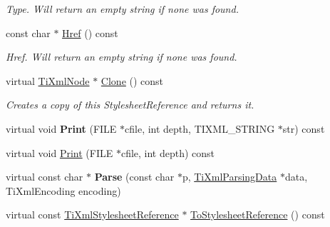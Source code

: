\begin{DoxyCompactItemize}
\begin{DoxyCompactList}\small\item\em Type. Will return an empty string if none was found. \item\end{DoxyCompactList}\item 
\hypertarget{class_ti_xml_stylesheet_reference_aabe8ce94938c7a37b5a7db10c08b719d}{
const char $\ast$ \hyperlink{class_ti_xml_stylesheet_reference_aabe8ce94938c7a37b5a7db10c08b719d}{Href} () const }
\label{class_ti_xml_stylesheet_reference_aabe8ce94938c7a37b5a7db10c08b719d}

\begin{DoxyCompactList}\small\item\em Href. Will return an empty string if none was found. \item\end{DoxyCompactList}\item 
\hypertarget{class_ti_xml_stylesheet_reference_a4e3ceb9a5650537c7fda02997edb5ec4}{
virtual \hyperlink{class_ti_xml_node}{TiXmlNode} $\ast$ \hyperlink{class_ti_xml_stylesheet_reference_a4e3ceb9a5650537c7fda02997edb5ec4}{Clone} () const }
\label{class_ti_xml_stylesheet_reference_a4e3ceb9a5650537c7fda02997edb5ec4}

\begin{DoxyCompactList}\small\item\em Creates a copy of this StylesheetReference and returns it. \item\end{DoxyCompactList}\item 
\hypertarget{class_ti_xml_stylesheet_reference_a8197c05d3e5df11e5edfe14cc6a41131}{
virtual void {\bfseries Print} (FILE $\ast$cfile, int depth, TIXML\_\-STRING $\ast$str) const }
\label{class_ti_xml_stylesheet_reference_a8197c05d3e5df11e5edfe14cc6a41131}

\item 
virtual void \hyperlink{class_ti_xml_stylesheet_reference_a49db8b6b92877c4afec7d20c307b9c6b}{Print} (FILE $\ast$cfile, int depth) const 
\item 
\hypertarget{class_ti_xml_stylesheet_reference_ab78a0990224ab108340002dc57526bae}{
virtual const char $\ast$ {\bfseries Parse} (const char $\ast$p, \hyperlink{class_ti_xml_parsing_data}{TiXmlParsingData} $\ast$data, TiXmlEncoding encoding)}
\label{class_ti_xml_stylesheet_reference_ab78a0990224ab108340002dc57526bae}

\item 
\hypertarget{class_ti_xml_stylesheet_reference_a70888be188ba04f5548159de36216dc1}{
virtual const \hyperlink{class_ti_xml_stylesheet_reference}{TiXmlStylesheetReference} $\ast$ \hyperlink{class_ti_xml_stylesheet_reference_a70888be188ba04f5548159de36216dc1}{ToStylesheetReference} () const }
\label{class_ti_xml_stylesheet_reference_a70888be188ba04f5548159de36216dc1}


\end{DoxyCompactItemize}
